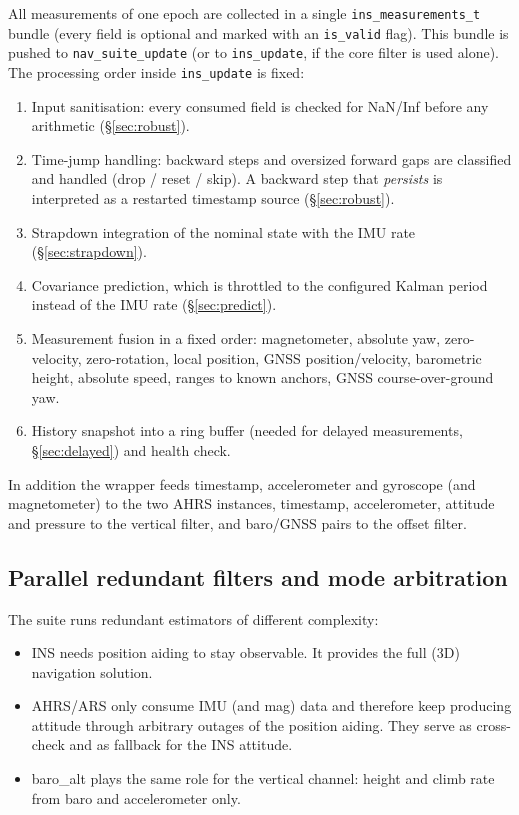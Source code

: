 \documentclass[11pt,a4paper]{article}
\newcommand{\code}[1]{\texttt{#1}}
\begin{document}
All measurements of one epoch are collected in a single
\code{ins\_\allowbreak{}measurements\_\allowbreak{}t} bundle (every field is
optional and marked with an \code{is\_\allowbreak{}valid} flag). This bundle is
pushed to \code{nav\_\allowbreak{}suite\_\allowbreak{}update} (or to
\code{ins\_\allowbreak{}update}, if the core filter is used alone). The
processing order inside \code{ins\_\allowbreak{}update} is fixed:

\begin{enumerate}
  \item Input sanitisation: every consumed field is checked for NaN/Inf before
        any arithmetic (\S\ref{sec:robust}).
  \item Time-jump handling: backward steps and oversized forward gaps are
        classified and handled (drop / reset / skip). A backward step that
        \emph{persists} is interpreted as a restarted timestamp source
        (\S\ref{sec:robust}).
  \item Strapdown integration of the nominal state with the IMU rate
        (\S\ref{sec:strapdown}).
  \item Covariance prediction, which is throttled to the configured Kalman
        period instead of the IMU rate (\S\ref{sec:predict}).
  \item Measurement fusion in a fixed order: magnetometer, absolute yaw,
        zero-velocity, zero-rotation, local position, GNSS position/velocity,
        barometric height, absolute speed, ranges to known anchors, GNSS
        course-over-ground yaw.
  \item History snapshot into a ring buffer (needed for delayed measurements,
        \S\ref{sec:delayed}) and health check.
\end{enumerate}

In addition the wrapper feeds timestamp, accelerometer and gyroscope (and
magnetometer) to the two AHRS instances, timestamp, accelerometer, attitude and
pressure to the vertical filter, and baro/GNSS pairs to the offset filter.

\subsection{Parallel redundant filters and mode arbitration}
\label{sec:suite}

The suite runs redundant estimators of different complexity:

\begin{itemize}
  \item INS needs position aiding to stay observable. It provides the full (3D)
        navigation solution.
  \item AHRS/ARS only consume IMU (and mag) data and therefore keep producing
        attitude through arbitrary outages of the position aiding. They serve
        as cross-check and as fallback for the INS attitude.
  \item baro\_alt plays the same role for the vertical channel: height and
        climb rate from baro and accelerometer only.
\end{itemize}
\end{document}
